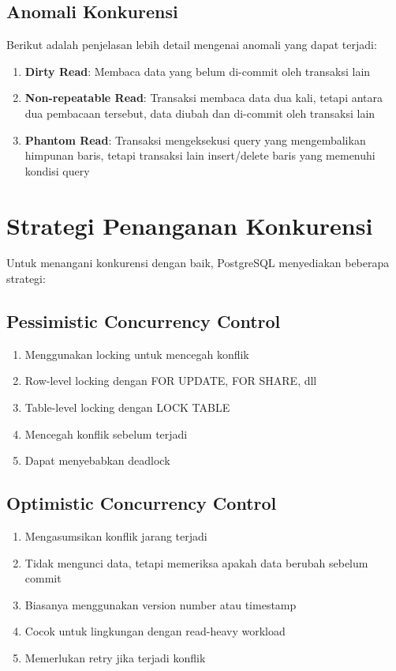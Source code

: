 \subsection{Anomali Konkurensi}

Berikut adalah penjelasan lebih detail mengenai anomali yang dapat terjadi:

\begin{enumerate}
    \item \textbf{Dirty Read}: Membaca data yang belum di-commit oleh transaksi lain
    \item \textbf{Non-repeatable Read}: Transaksi membaca data dua kali, tetapi antara dua pembacaan tersebut, data diubah dan di-commit oleh transaksi lain
    \item \textbf{Phantom Read}: Transaksi mengeksekusi query yang mengembalikan himpunan baris, tetapi transaksi lain insert/delete baris yang memenuhi kondisi query
\end{enumerate}

\section{Strategi Penanganan Konkurensi}

Untuk menangani konkurensi dengan baik, PostgreSQL menyediakan beberapa strategi:

\subsection{Pessimistic Concurrency Control}
\begin{enumerate}
    \item Menggunakan locking untuk mencegah konflik
    \item Row-level locking dengan FOR UPDATE, FOR SHARE, dll
    \item Table-level locking dengan LOCK TABLE
    \item Mencegah konflik sebelum terjadi
    \item Dapat menyebabkan deadlock
\end{enumerate}

\subsection{Optimistic Concurrency Control}
\begin{enumerate}
    \item Mengasumsikan konflik jarang terjadi
    \item Tidak mengunci data, tetapi memeriksa apakah data berubah sebelum commit
    \item Biasanya menggunakan version number atau timestamp
    \item Cocok untuk lingkungan dengan read-heavy workload
    \item Memerlukan retry jika terjadi konflik
\end{enumerate}

